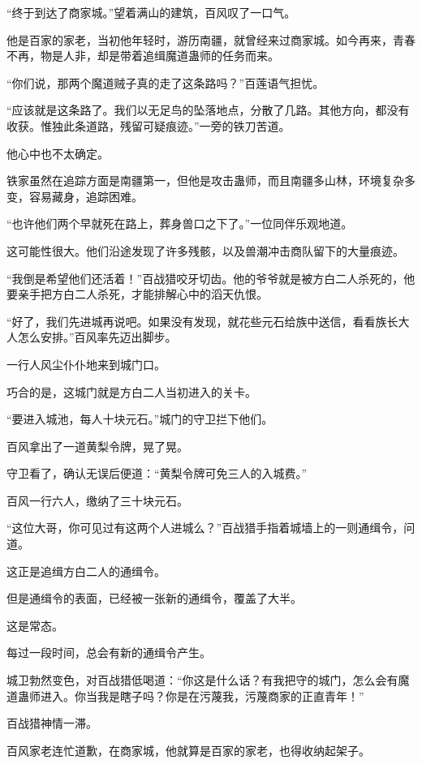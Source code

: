 
\begin{this_body}

“终于到达了商家城。”望着满山的建筑，百风叹了一口气。

他是百家的家老，当初他年轻时，游历南疆，就曾经来过商家城。如今再来，青春不再，物是人非，却是带着追缉魔道蛊师的任务而来。

“你们说，那两个魔道贼子真的走了这条路吗？”百莲语气担忧。

“应该就是这条路了。我们以无足鸟的坠落地点，分散了几路。其他方向，都没有收获。惟独此条道路，残留可疑痕迹。”一旁的铁刀苦道。

他心中也不太确定。

铁家虽然在追踪方面是南疆第一，但他是攻击蛊师，而且南疆多山林，环境复杂多变，容易藏身，追踪困难。

“也许他们两个早就死在路上，葬身兽口之下了。”一位同伴乐观地道。

这可能性很大。他们沿途发现了许多残骸，以及兽潮冲击商队留下的大量痕迹。

“我倒是希望他们还活着！”百战猎咬牙切齿。他的爷爷就是被方白二人杀死的，他要亲手把方白二人杀死，才能排解心中的滔天仇恨。

“好了，我们先进城再说吧。如果没有发现，就花些元石给族中送信，看看族长大人怎么安排。”百风率先迈出脚步。

一行人风尘仆仆地来到城门口。

巧合的是，这城门就是方白二人当初进入的关卡。

“要进入城池，每人十块元石。”城门的守卫拦下他们。

百风拿出了一道黄梨令牌，晃了晃。

守卫看了，确认无误后便道：“黄梨令牌可免三人的入城费。”

百风一行六人，缴纳了三十块元石。

“这位大哥，你可见过有这两个人进城么？”百战猎手指着城墙上的一则通缉令，问道。

这正是追缉方白二人的通缉令。

但是通缉令的表面，已经被一张新的通缉令，覆盖了大半。

这是常态。

每过一段时间，总会有新的通缉令产生。

城卫勃然变色，对百战猎低喝道：“你这是什么话？有我把守的城门，怎么会有魔道蛊师进入。你当我是瞎子吗？你是在污蔑我，污蔑商家的正直青年！”

百战猎神情一滞。

百风家老连忙道歉，在商家城，他就算是百家的家老，也得收纳起架子。


\end{this_body}
